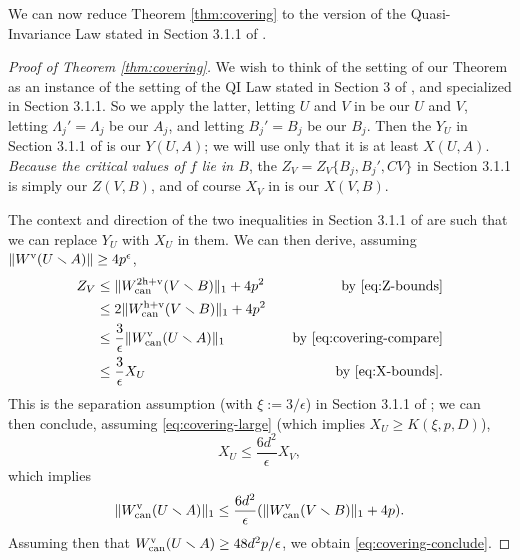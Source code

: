 We can now reduce Theorem \ref{thm:covering} to the version of the Quasi-Invariance Law stated in Section 3.1.1 of \cite{covering lemma}.
\begin{proof}[Proof of Theorem \ref{thm:covering}]
We wish to think of the setting of our Theorem as an instance of the setting of the QI Law stated in Section 3 of \cite{covering lemma},
and specialized in Section 3.1.1. 
So we apply the latter,
letting $U$ and $V$ in \cite{covering lemma} be our $U$ and $V$,
letting $\Lambda_j' = \Lambda_j$ be our $A_j$,
and letting $B_j' = B_j$ be our $B_j$.
Then the $Y_U$ in Section 3.1.1 of \cite{covering lemma} is our $Y(U, A)$; we will use only that it is at least $X(U, A)$.
\emph{Because the critical values of $f$ lie in $B$},
the $Z_V = Z_V\{B_j, B_j', CV\}$ in Section 3.1.1 is simply our $Z(V, B)$,
and of course $X_V$ in \cite{covering lemma} is our $X(V, B)$. 

The context and direction of the two inequalities in Section 3.1.1 of \cite{covering lemma} are such that we can replace $Y_U$ with $X_U$ in them. 
We can then derive,
assuming $\Vert W^{\mathrm{v}}(U\smallsetminus A) \Vert \ge 4p^\epsilon$,
\begin{align*}
Z_V &\le \Vert W_{\operatorname{can}}^{2{\mathrm{h}}+{\mathrm{v}}}(V \smallsetminus B) \Vert_1 + 4p^2 \quad&\text{by \eqref{eq:Z-bounds}} \\
&\le 2 \Vert W_{\operatorname{can}}^{{\mathrm{h}}+{\mathrm{v}}}(V \smallsetminus B) \Vert_1 + 4p^2 \\
&\le \frac3\epsilon \Vert W_{\operatorname{can}}^{\mathrm{v}}(U \smallsetminus A) \Vert_1 &\text{by \eqref{eq:covering-compare}}\\
&\le \frac3\epsilon X_U &\text{by \eqref{eq:X-bounds}}. 
\end{align*}
This is the separation assumption (with $\xi :=  3/\epsilon$) in Section 3.1.1 of \cite{covering lemma};
we can then conclude,
assuming \eqref{eq:covering-large} (which implies $X_U \ge K(\xi, p, D)$),
$$
X_U \le \frac{6d^2}\epsilon X_V,
$$
which implies
$$
\Vert W_{\operatorname{can}}^{\mathrm{v}}(U \smallsetminus A) \Vert_1 \le \frac{6d^2}\epsilon(\Vert W_{\operatorname{can}}^{\mathrm{v}}(V \smallsetminus B) \Vert_1 + 4 p).
$$
Assuming then that $W_{\operatorname{can}}^{\mathrm{v}}(U \smallsetminus A) \ge 48d^2p/\epsilon$,
we obtain \eqref{eq:covering-conclude}.
\end{proof}

